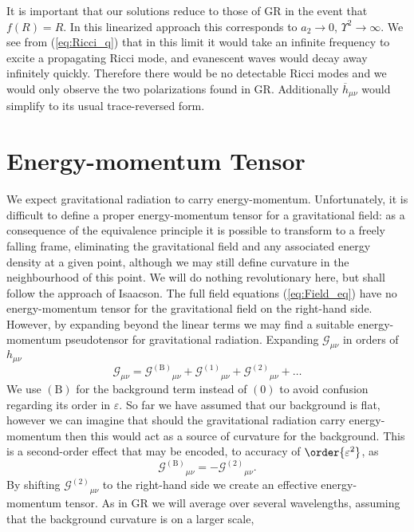\documentclass[aps,prd,reprint,showpacs]{revtex4-1}
\newcommand{\eqnref}[1]{(\ref{eq:#1})}
\begin{document}
It is important that our solutions reduce to those of GR in the event that $f(R) = R$. In this linearized approach this corresponds to $a_2 \rightarrow 0$, $\Upsilon^2 \rightarrow \infty$. We see from \eqnref{Ricci_q} that in this limit it would take an infinite frequency to excite a propagating Ricci mode, and evanescent waves would decay away infinitely quickly. Therefore there would be no detectable Ricci modes and we would only observe the two polarizations found in GR. Additionally $\overline{h}_{\mu\nu}$ would simplify to its usual trace-reversed form.

\section{Energy-momentum Tensor\label{sec:EM_tensor}}

We expect gravitational radiation to carry energy-momentum. Unfortunately, it is difficult to define a proper energy-momentum tensor for a gravitational field: as a consequence of the equivalence principle it is possible to transform to a freely falling frame, eliminating the gravitational field and any associated energy density at a given point, although we may still define curvature in the neighbourhood of this point\cite{Misner1973, Hobson2006}. We will do nothing revolutionary here, but shall follow the approach of Isaacson\cite{Isaacson1968, Isaacson1968a}. The full field equations \eqnref{Field_eq} have no energy-momentum tensor for the gravitational field on the right-hand side. However, by expanding beyond the linear terms we may find a suitable energy-momentum pseudotensor for gravitational radiation. Expanding $\mathcal{G}_{\mu\nu}$ in orders of $h_{\mu\nu}$
\begin{equation}
\mathcal{G}_{\mu\nu} = {\mathcal{G}^{(\text{B})}}_{\mu\nu} + {\mathcal{G}^{(1)}}_{\mu\nu} + {\mathcal{G}^{(2)}}_{\mu\nu} + \ldots
\label{eq:G_exp}
\end{equation}
We use $(\text{B})$ for the background term instead of $(0)$ to avoid confusion regarding its order in $\varepsilon$. So far we have assumed that our background is flat, however we can imagine that should the gravitational radiation carry energy-momentum then this would act as a source of curvature for the background. This is a second-order effect that may be encoded, to accuracy of $\order{\varepsilon^2}$, as
\begin{equation}
{\mathcal{G}^{(\text{B})}}_{\mu\nu} = -{\mathcal{G}^{(2)}}_{\mu\nu}.
\end{equation}
By shifting ${\mathcal{G}^{(2)}}_{\mu\nu}$ to the right-hand side we create an effective energy-momentum tensor. As in GR we will average over several wavelengths, assuming that the background curvature is on a larger scale\cite{Misner1973},
\end{document}
